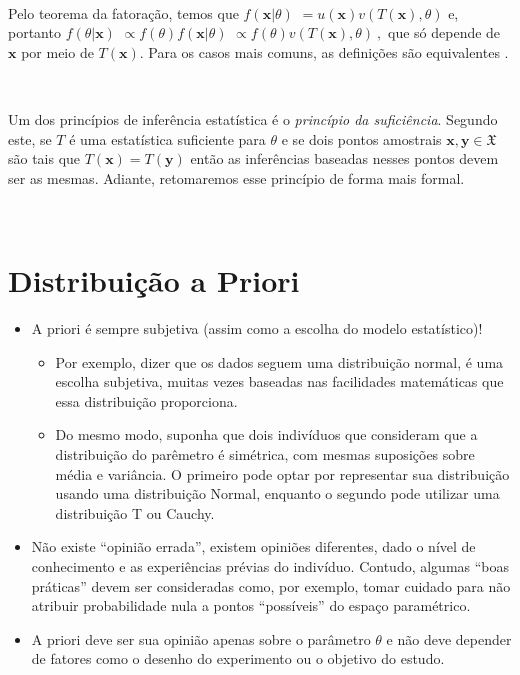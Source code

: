 \documentclass[
]{book}
\providecommand{\tightlist}{%
  \setlength{\itemsep}{0pt}\setlength{\parskip}{0pt}}
\begin{document}
\(~\)

Pelo teorema da fatoração, temos que \(f\left(\boldsymbol x | \theta\right)\) \(= u(\boldsymbol x) v\left(T(\boldsymbol x),\theta\right)\) e, portanto \(f(\theta|\boldsymbol x)\) \(\propto f(\theta) f\left(\boldsymbol x | \theta\right)\) \(\propto f(\theta) v\left(T(\boldsymbol x),\theta\right)~,\) que só depende de \(\boldsymbol x\) por meio de \(T(\boldsymbol x)\). Para os casos mais comuns, as definições são equivalentes \citep{Schervish12}.

\(~\)

Um dos princípios de inferência estatística é o \emph{princípio da suficiência}. Segundo este, se \(T\) é uma estatística suficiente para \(\theta\) e se dois pontos amostrais \(\boldsymbol x, \boldsymbol y \in \mathfrak{X}\) são tais que \(T(\boldsymbol x)=T(\boldsymbol y)\) então as inferências baseadas nesses pontos devem ser as mesmas. Adiante, retomaremos esse princípio de forma mais formal.

\(~\)

\hypertarget{distribuiuxe7uxe3o-a-priori}{%
\section{Distribuição a Priori}\label{distribuiuxe7uxe3o-a-priori}}

\begin{itemize}
\tightlist
\item
  A priori é sempre subjetiva (assim como a escolha do modelo estatístico)!

  \begin{itemize}
  \tightlist
  \item
    Por exemplo, dizer que os dados seguem uma distribuição normal, é uma escolha subjetiva, muitas vezes baseadas nas facilidades matemáticas que essa distribuição proporciona.\\
  \item
    Do mesmo modo, suponha que dois indivíduos que consideram que a distribuição do parêmetro é simétrica, com mesmas suposições sobre média e variância. O primeiro pode optar por representar sua distribuição usando uma distribuição Normal, enquanto o segundo pode utilizar uma distribuição T ou Cauchy.\\
  \end{itemize}
\item
  Não existe ``opinião errada'', existem opiniões diferentes, dado o nível de conhecimento e as experiências prévias do indivíduo. Contudo, algumas ``boas práticas'' devem ser consideradas como, por exemplo, tomar cuidado para não atribuir probabilidade nula a pontos ``possíveis'' do espaço paramétrico.\\
\item
  A priori deve ser sua opinião apenas sobre o parâmetro \(\theta\) e não deve depender de fatores como o desenho do experimento ou o objetivo do estudo.
\end{itemize}
\end{document}

